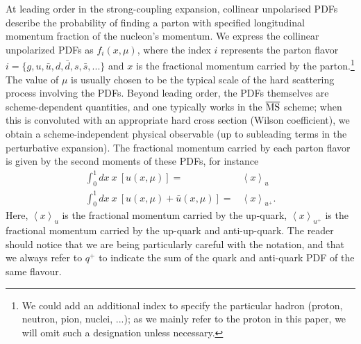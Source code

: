 At leading order in the strong-coupling expansion, 
collinear unpolarised PDFs describe the probability of finding a parton with specified longitudinal momentum fraction 
of the nucleon's momentum. 
We express the collinear unpolarized PDFs as $f_{i}(x,\mu)$,
where the index $i$ represents the parton flavor $i=\{g,u,\bar{u},d,\bar{d},s,\bar{s},...\}$ and
$x$ is the fractional momentum carried by the parton.\footnote{We could add an additional index to specify the particular hadron
(proton, neutron, pion, nuclei, ...); as we mainly refer to the proton
  in this paper, we will omit such a designation unless necessary.}
%
The value of $\mu$ is usually chosen to be the typical scale of the hard scattering
process involving the PDFs.
%
Beyond leading order, the PDFs themselves
are scheme-dependent quantities, and one typically works in
the $\overline{\rm MS}$ scheme; when this is convoluted with an appropriate
hard cross section (Wilson coefficient), we obtain a scheme-independent
physical observable (up to subleading terms in the perturbative expansion). 
%
The fractional momentum carried
by each parton flavor is given by the second moments of these PDFs, for instance
%
\begin{align}
\int_{0}^{1}dx\ x\ \left[u(x,\mu)\right] = & {}  \left\langle x\right\rangle _{u} \label{eq:umoment1}\\
\int_{0}^{1}dx\ x\ \left[u(x,\mu)+\bar{u}(x,\mu)\right] = & {} \left\langle x\right\rangle _{u^{+}} \label{eq:uplusmoment1}.
\end{align}
%
Here, $\left\langle x\right\rangle _{u}$ is the fractional momentum
carried by the up-quark, $\left\langle x\right\rangle _{u^{+}}$ is
the fractional momentum carried by the up-quark and anti-up-quark.
%
The reader should notice that we are being particularly careful
with the notation, and that we always refer to $q^+$ to indicate
the sum of the quark and anti-quark PDF of the same flavour.


